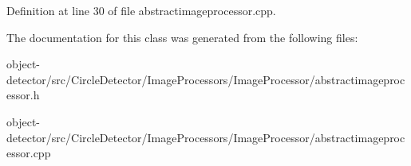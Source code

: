 Definition at line 30 of file abstractimageprocessor.\+cpp.



The documentation for this class was generated from the following files\+:\begin{DoxyCompactItemize}
\item 
object-\/detector/src/\+Circle\+Detector/\+Image\+Processors/\+Image\+Processor/abstractimageprocessor.\+h\item 
object-\/detector/src/\+Circle\+Detector/\+Image\+Processors/\+Image\+Processor/abstractimageprocessor.\+cpp\end{DoxyCompactItemize}
